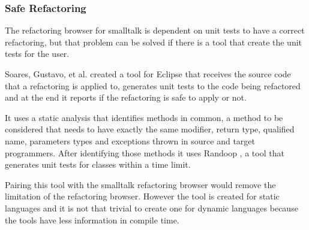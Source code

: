 %

\subsubsection{Safe Refactoring}

The refactoring browser for smalltalk is dependent on unit tests to have a correct refactoring, but that problem can be solved if there is a tool that create the unit tests for the user.

Soares, Gustavo, et al. \cite{soares2010making} created a tool for Eclipse that receives the source code that a refactoring is applied to, generates unit tests to the code being refactored and at the end it reports if the refactoring is safe to apply or not.

It uses a static analysis that identifies methods in common, a method to be considered that needs to have exactly the same modifier, return type, qualified name, parameters types and exceptions thrown in source and target programmers.
After identifying those methods it uses Randoop \cite{pacheco2007feedback},  %
 a tool that generates unit tests for classes within a time limit.

Pairing this tool with the smalltalk refactoring browser would remove the limitation of the refactoring browser.
However the tool is created for static languages and it is not that trivial to create one for dynamic languages because the tools have less information in compile time.